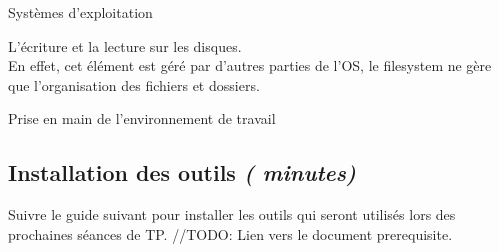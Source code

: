 \begin{section}{Systèmes d'exploitation}
    \begin{solution}
        L'écriture et la lecture sur les disques. \\
	
	En effet, cet élément est géré par d'autres parties de l'OS, le filesystem ne gère que l'organisation des fichiers et dossiers. \\ 
    \end{solution}
    
\end{section}
\begin{section}{Prise en main de l'environnement de travail}
    \subsection{Installation des outils \textit{(\faClock {} minutes)}} 
        Suivre le guide suivant pour installer les outils qui seront utilisés lors des prochaines séances de TP. //TODO: Lien vers le document prerequisite.
\end{section}
